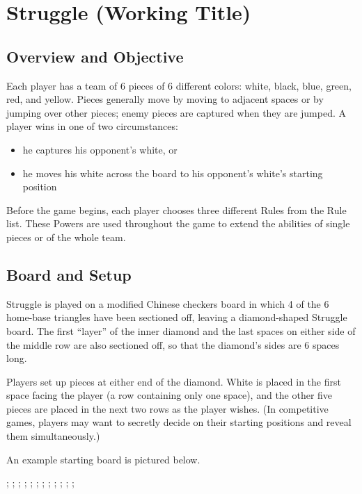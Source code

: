 \documentclass[../rulebook.tex]{subfiles}
\begin{document}
\section*{Struggle (Working Title)}
\subsection*{Overview and Objective}
Each player has a team of 6 pieces of 6 different colors:
white, black, blue, green, red, and yellow.
Pieces generally move by moving to adjacent spaces or by jumping over other pieces;
enemy pieces are captured when they are jumped.
A player wins in one of two circumstances:
\begin{itemize}\itemsep0pt
\item he captures his opponent's white, or 
\item he moves his white across the board to his opponent's white's starting position
\end{itemize}

Before the game begins, each player chooses three different Rules
from the Rule list.
These Powers are used throughout the game to extend the abilities
of single pieces or of the whole team.

\subsection*{Board and Setup}
Struggle is played on a modified Chinese checkers board in which 4 of the 6 home-base triangles have been sectioned off, leaving a diamond-shaped Struggle board.  The first “layer” of the inner diamond and the last spaces on either side of the middle row are also sectioned off, so that the diamond's sides are 6 spaces long.


Players set up pieces at either end of the diamond.
White is placed in the first space facing the player
(a row containing only one space),
and the other five pieces are placed in the next two rows
as the player wishes. (In competitive games, players may want to secretly
decide on their starting positions and reveal them simultaneously.)

An example starting board is pictured below.

\begin{center}
\begin{struggleboard}
  ;
  ;
  ;
  ;
  ;
  ;
  ;
  ;
  ;
  ;
  ;
  ;
\end{struggleboard}
\end{center}
\end{document}

